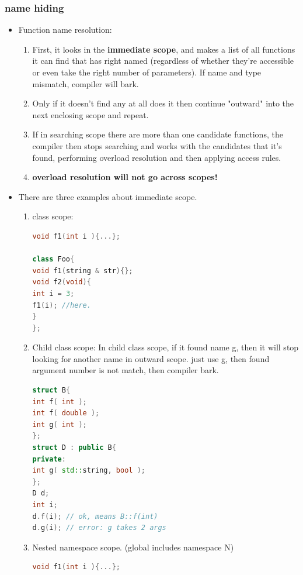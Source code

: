 \documentclass[a4paper,12pt,twoside]{book}
\begin{document}
\subsubsection{name hiding}
\begin{itemize}
\item Function name resolution:
\begin{enumerate}
\item First, it looks in the \textbf{immediate scope},  and makes a list of all functions it can find that has right named  (regardless of whether they're accessible or even take the right number of parameters). If name and type mismatch, compiler will bark.
\item Only if it doesn't find any at all does it then continue "outward" into the next enclosing scope and repeat.
\item If in searching scope there are more than one candidate functions, the compiler then stops searching and works with the candidates that it's found, performing overload resolution and then applying access rules.
\item \textbf{overload resolution will not go across scopes!}
\end{enumerate}

\item There are three examples about immediate scope.
\begin{enumerate}
\item class scope:
\begin{lstlisting}[frame=single, language=c++]
void f1(int i ){...};

class Foo{
void f1(string & str){};
void f2(void){
int i = 3;
f1(i); //here.
}
};
\end{lstlisting}
\item Child class scope: In child class scope, if it found name g, then it will stop looking for another name in outward scope. just use g, then found argument number is not match, then compiler bark.
\begin{lstlisting}[frame=single, language=c++]
struct B{
int f( int );
int f( double );
int g( int );
};
struct D : public B{
private:
int g( std::string, bool );
};
D d;
int i;
d.f(i); // ok, means B::f(int)
d.g(i); // error: g takes 2 args
\end{lstlisting}
\item Nested namespace scope. (global includes namespace N)
\begin{lstlisting}[frame=single, language=c++]
void f1(int i ){...};


\end{lstlisting}
\end{enumerate}
\end{itemize}
\end{document}
